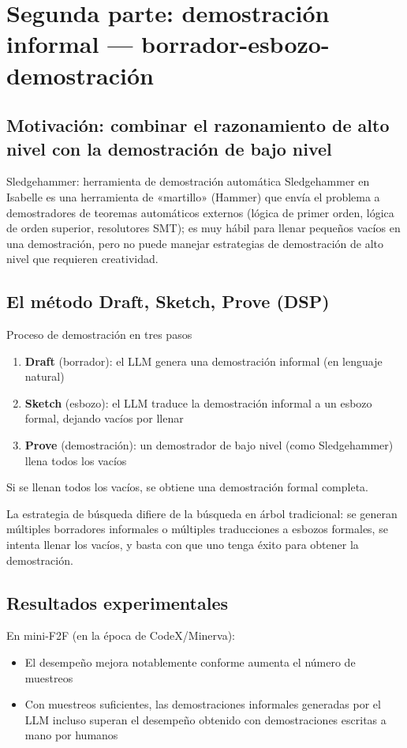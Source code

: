 \section{Segunda parte: demostración informal — borrador-esbozo-demostración}

\subsection{Motivación: combinar el razonamiento de alto nivel con la demostración de bajo nivel}

\begin{knowledgebox}{Sledgehammer: herramienta de demostración automática}
Sledgehammer en Isabelle es una herramienta de «martillo» (Hammer) que envía el problema a demostradores de teoremas automáticos externos (lógica de primer orden, lógica de orden superior, resolutores SMT); es muy hábil para llenar pequeños vacíos en una demostración, pero no puede manejar estrategias de demostración de alto nivel que requieren creatividad.
\end{knowledgebox}

\subsection{El método Draft, Sketch, Prove (DSP)}

\begin{importantbox}{Proceso de demostración en tres pasos}
\begin{enumerate}
    \item \textbf{Draft} (borrador): el LLM genera una demostración informal (en lenguaje natural)
    \item \textbf{Sketch} (esbozo): el LLM traduce la demostración informal a un esbozo formal, dejando vacíos por llenar
    \item \textbf{Prove} (demostración): un demostrador de bajo nivel (como Sledgehammer) llena todos los vacíos
\end{enumerate}
Si se llenan todos los vacíos, se obtiene una demostración formal completa.
\end{importantbox}

La estrategia de búsqueda difiere de la búsqueda en árbol tradicional: se generan múltiples borradores informales o múltiples traducciones a esbozos formales, se intenta llenar los vacíos, y basta con que uno tenga éxito para obtener la demostración.

\subsection{Resultados experimentales}

En mini-F2F (en la época de CodeX/Minerva):
\begin{itemize}
    \item El desempeño mejora notablemente conforme aumenta el número de muestreos
    \item Con muestreos suficientes, las demostraciones informales generadas por el LLM incluso superan el desempeño obtenido con demostraciones escritas a mano por humanos
\end{itemize}

